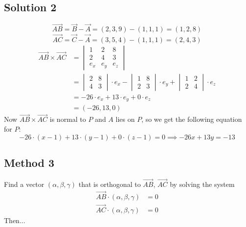 \documentclass[a4paper,10pt]{article}
\begin{document}
\subsection{Solution 2}
\[
    \overrightarrow{AB} = \overrightarrow{B} - \overrightarrow{A} = (2, 3, 9) - (1, 1, 1) = (1, 2, 8)
\]
\[
    \overrightarrow{AC} = \overrightarrow{C} - \overrightarrow{A} = (3, 5, 4) - (1, 1, 1) = (2, 4, 3)
\]
\begin{align*}
    \overrightarrow{AB} \times \overrightarrow{AC} & = \begin{vmatrix}
                                                           1 & 2 & 8 \\ 2 & 4 & 3 \\ e_x & e_y & e_z
                                                       \end{vmatrix} \\ & =  \begin{vmatrix}
        2 & 8 \\ 4 & 3
    \end{vmatrix} \cdot e_x - \begin{vmatrix}
        1 & 8 \\ 2 & 3
    \end{vmatrix} \cdot e_y + \begin{vmatrix}
        1 & 2 \\ 2 & 4
    \end{vmatrix} \cdot e_z \\
                                                   & = -26 \cdot e_x + 13\cdot e_y + 0\cdot e_z \\
                                                   & = (-26, 13, 0)
\end{align*}
Now $\overrightarrow{AB} \times \overrightarrow{AC}$ is normal to $P$ and $A$ lies on $P$, so we get the following equation for $P$:
\[
    -26\cdot(x -1) + 13\cdot (y-1) + 0\cdot (z-1) = 0 \implies -26x + 13y = -13
\]

\subsection{Method 3}
Find a vector $(\alpha, \beta, \gamma)$ that is orthogonal to $\overrightarrow{AB}$, $\overrightarrow{AC}$ by solving the system
\begin{align*}
    \overrightarrow{AB}\cdot (\alpha, \beta, \gamma) & = 0 \\
    \overrightarrow{AC}\cdot (\alpha, \beta, \gamma) & = 0
\end{align*}
Then...
\end{document}
